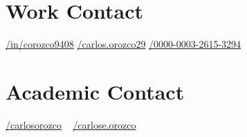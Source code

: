 \documentclass[american]{cv-class}
\begin{document}
\begin{aside}
	\section{Work Contact}
	\href{https://linkedin.com/in/corozco9408}{/in/corozco9408}
	\href{https://www.researchgate.net/profile/Carlos_Orozco29}{/carlos.orozco29}	\href{https://orcid.org/0000-0003-2615-3294}{/0000-0003-2615-3294}
	~ 
	\section{Academic Contact}
	\href{mailto:carlosorozco@unicauca.edu.co}{/carlosorozco} 	~
	\href{mailto:carlose.orozco@udea.edu.co}{/carlose.orozco}
	~

\end{aside}
\end{document}
